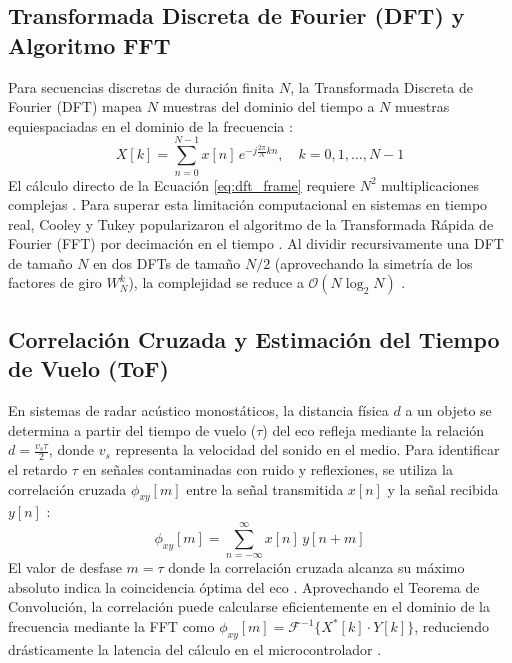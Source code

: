 \documentclass[conference]{IEEEtran}
\begin{document}
\subsection{Transformada Discreta de Fourier (DFT) y Algoritmo FFT} 
Para secuencias discretas de duración finita $N$, la Transformada Discreta de Fourier (DFT) mapea $N$ muestras del dominio del tiempo a $N$ muestras equiespaciadas en el dominio de la frecuencia \cite{oppenheim1997}: 
\begin{equation} 
X[k] = \sum_{n=0}^{N-1} x[n] \, e^{-j \frac{2\pi}{N} k n}, \quad k = 0, 1, \dots, N-1 \label{eq:dft_frame} 
\end{equation} 
El cálculo directo de la Ecuación \eqref{eq:dft_frame} requiere $N^2$ multiplicaciones complejas \cite{cooley1965, oppenheim1997}. Para superar esta limitación computacional en sistemas en tiempo real, Cooley y Tukey popularizaron el algoritmo de la Transformada Rápida de Fourier (FFT) por decimación en el tiempo \cite{cooley1965}. Al dividir recursivamente una DFT de tamaño $N$ en dos DFTs de tamaño $N/2$ (aprovechando la simetría de los factores de giro $W_N^k$), la complejidad se reduce a $\mathcal{O}(N \log_2 N)$ \cite{cooley1965, oppenheim1997}. 

\subsection{Correlación Cruzada y Estimación del Tiempo de Vuelo (ToF)} 
En sistemas de radar acústico monostáticos, la distancia física $d$ a un objeto se determina a partir del tiempo de vuelo ($\tau$) del eco refleja mediante la relación $d = \frac{v_s \tau}{2}$, donde $v_s$ representa la velocidad del sonido en el medio. Para identificar el retardo $\tau$ en señales contaminadas con ruido y reflexiones, se utiliza la correlación cruzada $\phi_{xy}[m]$ entre la señal transmitida $x[n]$ y la señal recibida $y[n]$ \cite{oppenheim1997}: 
\begin{equation} 
\phi_{xy}[m] = \sum_{n=-\infty}^{\infty} x[n] \, y[n+m] 
\end{equation} 
El valor de desfase $m = \tau$ donde la correlación cruzada alcanza su máximo absoluto indica la coincidencia óptima del eco \cite{oppenheim1997}. Aprovechando el Teorema de Convolución, la correlación puede calcularse eficientemente en el dominio de la frecuencia mediante la FFT como $\phi_{xy}[m] = \mathcal{F}^{-1}\{ X^*[k] \cdot Y[k] \}$, reduciendo drásticamente la latencia del cálculo en el microcontrolador \cite{oppenheim1997}.
\end{document}
